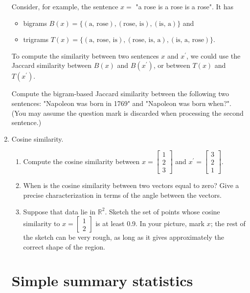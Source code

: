 \documentclass{article}
\begin{document}
\begin{enumerate}
    Consider, for example, the sentence $x=$ "a rose is a rose is a rose". It has
    \begin{itemize}
    \item bigrams $B(x)=\{(\text{a, rose}), (\text{rose, is}), (\text{is, a})\}$ and
    \item trigrams $T(x)=\{(\text{a, rose, is}), (\text{rose, is, a}), (\text{is, a, rose})\}$.
    \end{itemize}

    To compute the similarity between two sentences $x$ and $x^{\prime}$, we could use the Jaccard similarity between $B(x)$ and $B(x^{\prime})$, or between $T(x)$ and $T(x^{\prime})$.

    Compute the bigram-based Jaccard similarity between the following two sentences: "Napoleon was born in 1769" and "Napoleon was born when?". (You may assume the question mark is discarded when processing the second sentence.)

\item Cosine similarity.
    \begin{enumerate}
    \item Compute the cosine similarity between $x=\begin{bmatrix} 1 \\ 2 \\ 3 \end{bmatrix}$ and $x^{\prime}=\begin{bmatrix} 3 \\ 2 \\ 1 \end{bmatrix}$.
    \item When is the cosine similarity between two vectors equal to zero? Give a precise characterization in terms of the angle between the vectors.
    \item Suppose that data lie in $\mathbb{R}^{2}$. Sketch the set of points whose cosine similarity to $x=\begin{bmatrix} 1 \\ 2 \end{bmatrix}$ is at least 0.9. In your picture, mark $x$; the rest of the sketch can be very rough, as long as it gives approximately the correct shape of the region.
    \end{enumerate}

\section*{Simple summary statistics}


\end{enumerate}
\end{document}

